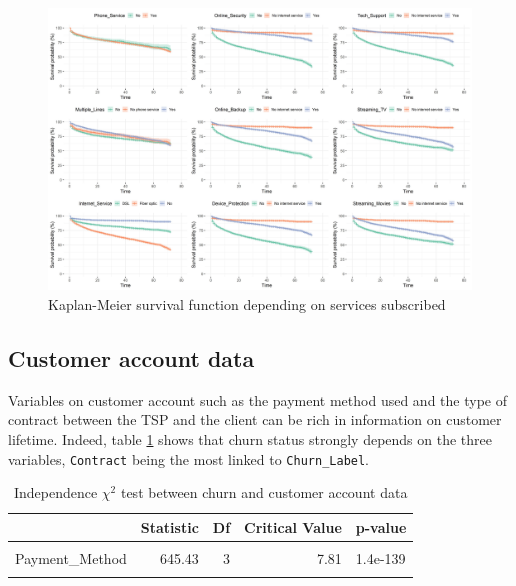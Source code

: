 \documentclass[
]{book}
\begin{document}
\begin{figure}

{\centering \includegraphics[width=75in]{./imgs/services_plot} 

}

\caption{Kaplan-Meier survival function depending on services subscribed}\label{fig:kmservices}
\end{figure}

\hypertarget{customer-account-data}{%
\subsection*{Customer account data}\label{customer-account-data}}

Variables on customer account such as the payment method used and the type of contract between the TSP and the client can be rich in information on customer lifetime. Indeed, table \ref{tab:chi2custaccount} shows that churn status strongly depends on the three variables, \texttt{Contract} being the most linked to \texttt{Churn\_Label}.

\begin{table}[H]

\caption{\label{tab:chi2custaccount}Independence $\chi^2$ test between churn and customer account data}
\centering
\begin{tabular}[t]{lrrrl}
\toprule
  & Statistic & Df & Critical Value & p-value\\
\midrule
\cellcolor{gray!6}{Contract} & \cellcolor{gray!6}{1179.55} & \cellcolor{gray!6}{2} & \cellcolor{gray!6}{5.99} & \cellcolor{gray!6}{7.3e-257}\\
Payment\_Method & 645.43 & 3 & 7.81 & 1.4e-139\\
\cellcolor{gray!6}{Paperless\_Billing} & \cellcolor{gray!6}{256.87} & \cellcolor{gray!6}{1} & \cellcolor{gray!6}{3.84} & \cellcolor{gray!6}{8.2e-58}\\
\bottomrule
\end{tabular}
\end{table}
\end{document}
